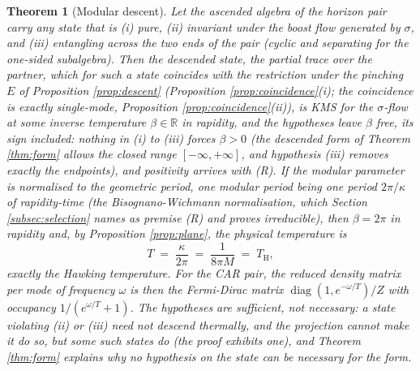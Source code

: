 \documentclass[11pt]{article}
\newtheorem{theorem}{Theorem}[section]
\theoremstyle{definition}
\newcommand{\R}{\mathbb{R}}
\renewcommand{\TH}{T_{\mathrm{H}}} %
\begin{document}
\begin{theorem}[Modular descent]\label{thm:descent}
Let the ascended algebra of the horizon pair carry any state that is (i) pure, (ii) invariant under the boost flow generated by $\sigma$, and (iii) entangling across the two ends of the pair (cyclic and separating for the one-sided subalgebra). Then the descended state, the partial trace over the partner, which for such a state coincides with the restriction under the pinching $E$ of Proposition \ref{prop:descent} (Proposition \ref{prop:coincidence}(i); the coincidence is exactly single-mode, Proposition \ref{prop:coincidence}(ii)), is KMS for the $\sigma$-flow at some inverse temperature $\beta \in \R$ in rapidity, and the hypotheses leave $\beta$ free, its sign included: nothing in (i) to (iii) forces $\beta > 0$ (the descended form of Theorem \ref{thm:form} allows the closed range $[-\infty, +\infty]$, and hypothesis (iii) removes exactly the endpoints), and positivity arrives with (R). If the modular parameter is normalised to the geometric period, one modular period being one period $2\pi/\kappa$ of rapidity-time (the Bisognano-Wichmann normalisation, which Section \ref{subsec:selection} names as premise (R) and proves irreducible), then $\beta = 2\pi$ in rapidity and, by Proposition \ref{prop:plane}, the physical temperature is
\[
T \;=\; \frac{\kappa}{2\pi} \;=\; \frac{1}{8\pi M} \;=\; \TH ,
\]
exactly the Hawking temperature. For the CAR pair, the reduced density matrix per mode of frequency $\omega$ is then the Fermi-Dirac matrix $\operatorname{diag}(1, e^{-\omega/T})/Z$ with occupancy $1/(e^{\omega/T} + 1)$. The hypotheses are sufficient, not necessary: a state violating (ii) or (iii) need not descend thermally, and the projection cannot make it do so, but some such states do (the proof exhibits one), and Theorem \ref{thm:form} explains why no hypothesis on the state can be necessary for the \emph{form}.
\end{theorem}
\end{document}
